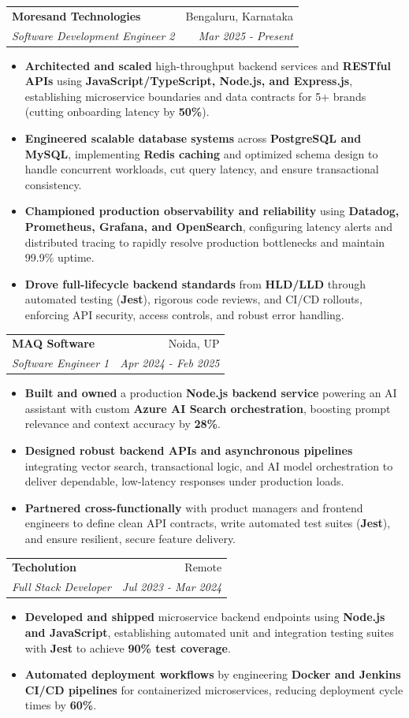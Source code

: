 \documentclass[a4paper,10pt]{article}
\makeatletter
\newcommand{\resumeSubheading}[4]{
  \vspace{-1pt}\item
    \begin{tabular*}{0.97\textwidth}{l@{\extracolsep{\fill}}r}
      \textbf{#1} & #2 \\
      \textit{#3} & \textit{#4} \\
    \end{tabular*}\vspace{-5pt}
}
\newcommand{\resumeItemListStart}{\begin{itemize}}
\newcommand{\resumeItemListEnd}{\end{itemize}\vspace{-5pt}}
\makeatother
\begin{document}
    \resumeSubheading{Moresand Technologies}{Bengaluru, Karnataka}
      {Software Development Engineer 2}{Mar 2025 - Present}
      \resumeItemListStart
        \item \textnormal{\textbf{Architected and scaled} high-throughput backend services and \textbf{RESTful APIs} using \textbf{JavaScript/TypeScript, Node.js, and Express.js}, establishing microservice boundaries and data contracts for 5+ brands (cutting onboarding latency by \textbf{50\%}).}
        \item \textnormal{\textbf{Engineered scalable database systems} across \textbf{PostgreSQL and MySQL}, implementing \textbf{Redis caching} and optimized schema design to handle concurrent workloads, cut query latency, and ensure transactional consistency.}
        \item \textnormal{\textbf{Championed production observability and reliability} using \textbf{Datadog, Prometheus, Grafana, and OpenSearch}, configuring latency alerts and distributed tracing to rapidly resolve production bottlenecks and maintain 99.9\% uptime.}
        \item \textnormal{\textbf{Drove full-lifecycle backend standards} from \textbf{HLD/LLD} through automated testing (\textbf{Jest}), rigorous code reviews, and CI/CD rollouts, enforcing API security, access controls, and robust error handling.}
      \resumeItemListEnd

    \resumeSubheading{MAQ Software}{Noida, UP}
      {Software Engineer 1}{Apr 2024 - Feb 2025}
      \resumeItemListStart
        \item \textnormal{\textbf{Built and owned} a production \textbf{Node.js backend service} powering an AI assistant with custom \textbf{Azure AI Search orchestration}, boosting prompt relevance and context accuracy by \textbf{28\%}.}
        \item \textnormal{\textbf{Designed robust backend APIs and asynchronous pipelines} integrating vector search, transactional logic, and AI model orchestration to deliver dependable, low-latency responses under production loads.}
        \item \textnormal{\textbf{Partnered cross-functionally} with product managers and frontend engineers to define clean API contracts, write automated test suites (\textbf{Jest}), and ensure resilient, secure feature delivery.}
      \resumeItemListEnd

    \resumeSubheading{Techolution}{Remote}
      {Full Stack Developer}{Jul 2023 - Mar 2024}
      \resumeItemListStart
        \item \textnormal{\textbf{Developed and shipped} microservice backend endpoints using \textbf{Node.js and JavaScript}, establishing automated unit and integration testing suites with \textbf{Jest} to achieve \textbf{90\% test coverage}.}
        \item \textnormal{\textbf{Automated deployment workflows} by engineering \textbf{Docker and Jenkins CI/CD pipelines} for containerized microservices, reducing deployment cycle times by \textbf{60\%}.}
      \resumeItemListEnd
\end{document}
